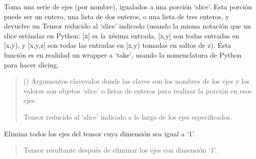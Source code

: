 \documentclass[letterpaper,10pt,english]{sphinxmanual}
\begin{document}
\begin{fulllineitems}
\begin{fulllineitems}
\label{\detokenize{myutils:myutils.tensor.Tensor.slice}}
\pysigstartsignatures
{}
\pysigstopsignatures
\sphinxAtStartPar
Toma una serie de ejes (por nombre), igualados a una porción ‘slice’. Esta porción puede ser
un entero, una lista de dos enteros, o una lista de tres enteros, y devuelve un Tensor reducido al ‘slice’
indicado (usando la misma notación que un slice estándar en Python: {[}x{]} es la x\sphinxhyphen{}ésima entrada, {[}x,y{]} son
todas entradas en {[}x,y), y {[}x,y,z{]} son todas las entradas en {[}x,y) tomadas en saltos de z). Esta función
es en realidad un wrapper a ‘take’, usando la nomenclatura de Python para hacer slicing.
\begin{quote}\begin{description}
\sphinxAtStartPar
{} () \textendash{} Argumentos clave\sphinxhyphen{}valor donde las claves son los nombres de los ejes y los valores
son objetos ‘slice’ o listas de enteros para realizar la porción en esos ejes.

\sphinxAtStartPar
Tensor reducido al ‘slice’ indicado a lo largo de los ejes especificados.

\sphinxAtStartPar
{\hyperref[\detokenize{myutils:myutils.tensor.Tensor}]{}}

\end{description}\end{quote}

\end{fulllineitems}


\begin{fulllineitems}
\label{\detokenize{myutils:myutils.tensor.Tensor.squeeze}}
\pysigstartsignatures
{}
\pysigstopsignatures
\sphinxAtStartPar
Elimina todos los ejes del tensor cuya dimensión sea igual a ‘1’.
\begin{quote}\begin{description}
\sphinxAtStartPar
Tensor resultante después de eliminar los ejes con dimensión ‘1’.


\end{description}
\end{quote}
\end{fulllineitems}
\end{fulllineitems}
\end{document}

